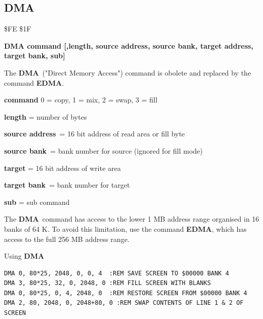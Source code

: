 \subsection{DMA}
\label{BASIC 65 Commands!DMA}
\begin{description}[leftmargin=2cm,style=nextline]
\item [Token:] \$FE \$1F
\item [Format:] {\bf DMA command [,length, source address,
                 source bank, target address, target bank, sub]}
\item [Usage:]
   The {\bf DMA} ("Direct Memory Access") command is obolete
   and replaced by the command {\bf EDMA}.

   {\bf command} 0 = copy, 1 = mix, 2 = swap, 3 = fill

   {\bf length} = number of bytes

   {\bf source address} = 16 bit address of read area or fill byte

   {\bf source bank} = bank number for source (ignored for fill mode)

   {\bf target} = 16 bit address of write area

   {\bf target bank} = bank number for target

   {\bf sub} = sub command

\item [Remarks:]
The {\bf DMA} command has access to the lower 1 MB address range
organised in 16 banks of 64 K. To avoid this limitation, use the
command {\bf EDMA}, which has access to the full 256 MB address range.

\item [Example:] Using {\bf DMA}
\begin{tcolorbox}[colback=black,coltext=white]
\verbatimfont{\codefont}
\begin{verbatim}
DMA 0, 80*25, 2048, 0, 0, 4  :REM SAVE SCREEN TO $00000 BANK 4
DMA 3, 80*25, 32, 0, 2048, 0 :REM FILL SCREEN WITH BLANKS
DMA 0, 80*25, 0, 4, 2048, 0  :REM RESTORE SCREEN FROM $00000 BANK 4
DMA 2, 80, 2048, 0, 2048+80, 0 :REM SWAP CONTENTS OF LINE 1 & 2 OF SCREEN
\end{verbatim}
\end{tcolorbox}
\end{description}


\newpage
